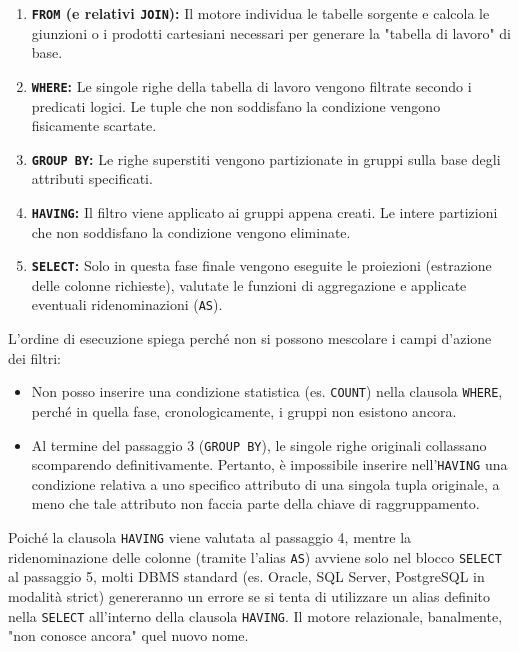 \begin{enumerate}
    \item \textbf{\texttt{FROM} (e relativi \texttt{JOIN}):} Il motore individua le tabelle sorgente e calcola le giunzioni o i prodotti cartesiani necessari per generare la "tabella di lavoro" di base.
    \item \textbf{\texttt{WHERE}:} Le singole righe della tabella di lavoro vengono filtrate secondo i predicati logici. Le tuple che non soddisfano la condizione vengono fisicamente scartate.
    \item \textbf{\texttt{GROUP BY}:} Le righe superstiti vengono partizionate in gruppi sulla base degli attributi specificati.
    \item \textbf{\texttt{HAVING}:} Il filtro viene applicato ai gruppi appena creati. Le intere partizioni che non soddisfano la condizione vengono eliminate.
    \item \textbf{\texttt{SELECT}:} Solo in questa fase finale vengono eseguite le proiezioni (estrazione delle colonne richieste), valutate le funzioni di aggregazione e applicate eventuali ridenominazioni (\texttt{AS}).
\end{enumerate}

\begin{warningbox}
L'ordine di esecuzione spiega perché non si possono mescolare i campi d'azione dei filtri:
\begin{itemize}
    \item Non posso inserire una condizione statistica (es. \texttt{COUNT}) nella clausola \texttt{WHERE}, perché in quella fase, cronologicamente, i gruppi non esistono ancora.
    \item Al termine del passaggio 3 (\texttt{GROUP BY}), le singole righe originali collassano scomparendo definitivamente. Pertanto, è impossibile inserire nell'\texttt{HAVING} una condizione relativa a uno specifico attributo di una singola tupla originale, a meno che tale attributo non faccia parte della chiave di raggruppamento.
\end{itemize}
\end{warningbox}

\begin{observation}
Poiché la clausola \texttt{HAVING} viene valutata al passaggio 4, mentre la ridenominazione delle colonne (tramite l'alias \texttt{AS}) avviene solo nel blocco \texttt{SELECT} al passaggio 5, molti DBMS standard (es. Oracle, SQL Server, PostgreSQL in modalità strict) genereranno un errore se si tenta di utilizzare un alias definito nella \texttt{SELECT} all'interno della clausola \texttt{HAVING}. Il motore relazionale, banalmente, "non conosce ancora" quel nuovo nome.
\end{observation}

